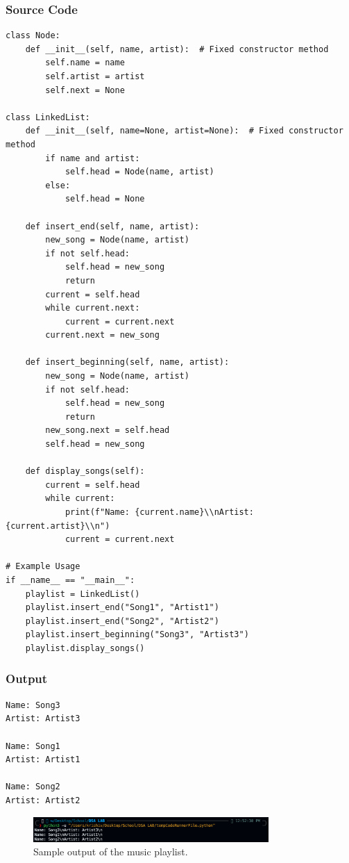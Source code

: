\documentclass[a4paper,12pt]{article}
\begin{document}
\subsubsection*{Source Code}
\begin{lstlisting}
class Node:
    def __init__(self, name, artist):  # Fixed constructor method
        self.name = name
        self.artist = artist
        self.next = None

class LinkedList:
    def __init__(self, name=None, artist=None):  # Fixed constructor method
        if name and artist:
            self.head = Node(name, artist)
        else:
            self.head = None

    def insert_end(self, name, artist):
        new_song = Node(name, artist)
        if not self.head:
            self.head = new_song
            return
        current = self.head
        while current.next:
            current = current.next
        current.next = new_song

    def insert_beginning(self, name, artist):
        new_song = Node(name, artist)
        if not self.head:
            self.head = new_song
            return
        new_song.next = self.head
        self.head = new_song

    def display_songs(self):
        current = self.head
        while current:
            print(f"Name: {current.name}\\nArtist: {current.artist}\\n")
            current = current.next

# Example Usage
if __name__ == "__main__":
    playlist = LinkedList()
    playlist.insert_end("Song1", "Artist1")
    playlist.insert_end("Song2", "Artist2")
    playlist.insert_beginning("Song3", "Artist3")
    playlist.display_songs()
\end{lstlisting}

\subsubsection*{Output}
\begin{verbatim}
Name: Song3
Artist: Artist3

Name: Song1
Artist: Artist1

Name: Song2
Artist: Artist2
\end{verbatim}

\begin{figure}[h]
    \centering
    \includegraphics[width=0.8\textwidth]{output_screenshot_exp1.png}
    \caption{Sample output of the music playlist.}
    \label{fig:output_exp1}
\end{figure}
\end{document}
